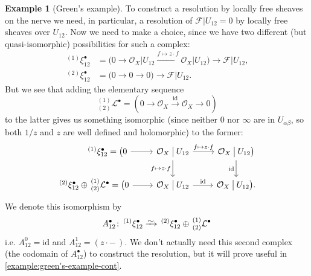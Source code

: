 \documentclass[11pt,fleqn]{article}
\theoremstyle{plain}
\theoremstyle{definition}
\newtheorem{example}[theorem]{Example}
\theoremstyle{remark}
\numberwithin{equation}{theorem}
\newcommand{\OO}{\mathcal{O}}
\newcommand{\restricted}{\mathbin{\big\vert}}
\newcommand{\id}{\mathrm{id}}
\newcommand{\congto}{\xrightarrow{\raisebox{-.5ex}[0ex][0ex]{$\sim$}}}
\begin{document}
\begin{example}[Green's example]
            To construct a resolution by locally free sheaves on the nerve we need, in particular, a resolution of $\mathscr{F}\restricted U_{12}=0$ by locally free sheaves over $U_{12}$.
            Now we need to make a choice, since we have two different (but quasi-isomorphic) possibilities for such a complex:
            \begin{align*}
                \,^{(1)}\xi_{12}^\bullet &= \big(0\to\OO_X\vert{U_{12}}\xrightarrow{f\mapsto z\cdot f}\OO_X\restricted {U_{12}}\big)\to \mathscr{F}\restricted {U_{12}},\\
                \,^{(2)}\xi_{12}^\bullet &= \big(0\to0\to0\big)\to \mathscr{F}\restricted {U_{12}}.
            \end{align*}
            But we see that adding the elementary sequence
            \begin{equation*}
                \,_{(2)}^{(1)}\mathcal{L}^\bullet=(0\to\OO_X\xrightarrow{\id}\OO_X\to0)
            \end{equation*}
            to the latter gives us something isomorphic (since neither $0$ nor $\infty$ are in $U_{\alpha\beta}$, so both $1/z$ and $z$ are well defined and holomorphic) to the former:
            \begin{equation*}
                \begin{tikzcd}
                    \qquad\quad\,\,^{(1)}\xi_{12}^\bullet=
                        \big(0 \ar[r]
                        &\OO_X\restricted {U_{12}} \ar[r,"f\mapsto z\cdot f"] \ar[d,swap,"f\mapsto z\cdot f"]
                        &\OO_X\restricted {U_{12}}\big) \ar[d,swap,"\id"]\\
                    \,^{(2)}\xi_{12}^\bullet\oplus\,_{(2)}^{(1)}\mathcal{L}^\bullet =
                        \big(0 \ar[r]
                        &\OO_X\restricted {U_{12}} \ar[r,"\id"]
                        &\OO_X\restricted {U_{12}}\big).
                \end{tikzcd}
            \end{equation*}
            We denote this isomorphism by
            \begin{equation*}
                A_{12}^\bullet\colon\,^{(1)}\xi_{12}^\bullet\congto\,^{(2)}\xi_{12}^\bullet\oplus\,_{(2)}^{(1)}\mathcal{L}^\bullet
            \end{equation*}
            i.e. $A_{12}^0=\id$ and $A_{12}^1=(z\cdot-\,)$.
            We don't actually need this second complex (the codomain of $A_{12}^\bullet$) to construct the resolution, but it will prove useful in \cref{example:green's-example-cont}.


\end{example}
\end{document}
